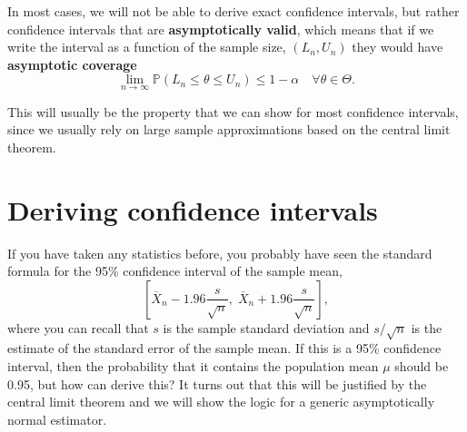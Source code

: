 \documentclass[
  letterpaper,
  DIV=11,
  numbers=noendperiod]{scrreprt}
\renewcommand{\P}{\mathbb{P}}
\newcommand{\Xbar}{\overline{X}}
\theoremstyle{definition}
\theoremstyle{plain}
\theoremstyle{definition}
\theoremstyle{remark}
\begin{document}
In most cases, we will not be able to derive exact confidence intervals,
but rather confidence intervals that are \textbf{asymptotically valid},
which means that if we write the interval as a function of the sample
size, \((L_n, U_n)\) they would have \textbf{asymptotic coverage} \[
\lim_{n\to\infty} \P(L_n \leq \theta \leq U_n) \leq 1-\alpha \quad\forall\theta\in\Theta.
\]

This will usually be the property that we can show for most confidence
intervals, since we usually rely on large sample approximations based on
the central limit theorem.

\hypertarget{deriving-confidence-intervals}{%
\section{Deriving confidence
intervals}\label{deriving-confidence-intervals}}

If you have taken any statistics before, you probably have seen the
standard formula for the 95\% confidence interval of the sample mean,
\[ 
\left[\Xbar_n - 1.96\frac{s}{\sqrt{n}},\; \Xbar_n + 1.96\frac{s}{\sqrt{n}}\right],
\] where you can recall that \(s\) is the sample standard deviation and
\(s/\sqrt{n}\) is the estimate of the standard error of the sample mean.
If this is a 95\% confidence interval, then the probability that it
contains the population mean \(\mu\) should be 0.95, but how can derive
this? It turns out that this will be justified by the central limit
theorem and we will show the logic for a generic asymptotically normal
estimator.
\end{document}
